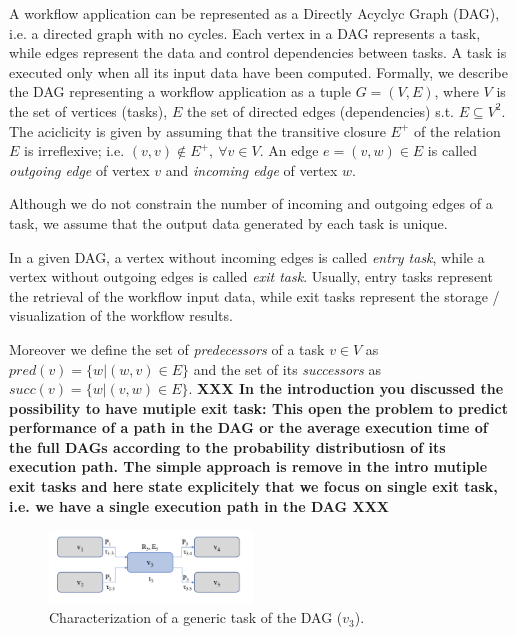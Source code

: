 \documentclass[a4paper, 10pt, conference]{ieeeconf}      %
\begin{document}
A workflow application can be represented as a Directly Acyclyc Graph (DAG), i.e. a directed graph with no cycles. Each vertex in a DAG represents a task, while edges represent the data and control dependencies between tasks.  A task is executed only when all its input data have been computed.
Formally, we describe the DAG representing a workflow application as a tuple $G=(V,E)$, where $V$ is the set of vertices (tasks), $E$ the set of directed edges (dependencies) s.t. $E\subseteq V^2$.
The aciclicity is given by assuming that the transitive closure $E^+$ of the relation $E$ is irreflexive; i.e. $(v, v) \not \in E ^+ ,\ \forall v \in V$. An edge  $e=(v,w)\in E$ is called \textit{outgoing edge} of vertex $v$ and \textit{incoming edge} of vertex $w$.

Although we do not constrain the number of incoming and outgoing edges of a task,
we assume that the output data generated by each task is unique.

In a given DAG, a vertex without incoming edges is called \textit{entry task}, while a vertex without outgoing edges is called \textit{exit task}. Usually, entry tasks represent the retrieval of the workflow input data, while exit tasks represent the storage / visualization of the workflow results.

Moreover we define the set of \textit{predecessors} of a task $v \in V$ as $pred(v) =\{ w | (w,v) \in E \} $ and the set of its \textit{successors} as $succ(v) =\{ w | (v,w) \in E \}$.
\textbf{XXX In the introduction you discussed the possibility to have mutiple exit task: This open the problem to predict performance of a path in the DAG or the average execution time of the full DAGs according to the probability distributiosn of its execution path.  The simple approach is remove in the intro mutiple exit tasks and here state explicitely that we focus on single exit task, i.e. we have a single execution path in the DAG XXX} 
\begin{figure}
  \centering
  \includegraphics[width=0.48\textwidth]{sources/task.png}
  \caption{Characterization of a generic task of the DAG ($v_3$). 
  }
\label{fig:operator}
\end{figure}
\end{document}
